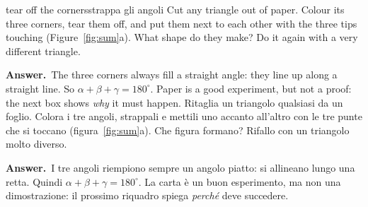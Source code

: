 \documentclass[10pt,a4paper,oneside]{book}
\newif\ifIT
\newcommand{\answer}{\par\vspace{2pt}{\color{deeporange}\rule[0.5ex]{\linewidth}{0.4pt}}\par
  {\sffamily\bfseries\small\color{deeporange}\ifIT Risposta\else Answer\fi.}\ }
\begin{document}
\begin{think}{tear off the corners}{strappa gli angoli}
Cut any triangle out of paper. Colour its three corners, tear them off, and put them next to each other with the three tips touching (Figure~\ref{fig:sum}a). What shape do they make? Do it again with a very different triangle.
\answer The three corners always fill a straight angle: they line up along a straight line. So $\alpha + \beta + \gamma = 180^\circ$. Paper is a good experiment, but not a proof: the next box shows \emph{why} it must happen.
\tcblower
Ritaglia un triangolo qualsiasi da un foglio. Colora i tre angoli, strappali e mettili uno accanto all'altro con le tre punte che si toccano (figura~\ref{fig:sum}a). Che figura formano? Rifallo con un triangolo molto diverso.
\answer I tre angoli riempiono sempre un angolo piatto: si allineano lungo una retta. Quindi $\alpha + \beta + \gamma = 180^\circ$. La carta è un buon esperimento, ma non una dimostrazione: il prossimo riquadro spiega \emph{perché} deve succedere.
\end{think}
\end{document}
